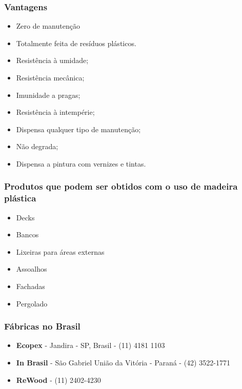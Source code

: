 \subsubsection*{\textbf{Vantagens}\cite{ReWood}}
	
	\begin{itemize}
		\item Zero de manutenção
		\item Totalmente feita de resíduos plásticos.
		\item Resistência à umidade;
		\item Resistência mecânica;
		\item Imunidade a pragas;
		\item Resistência à intempérie;
		\item Dispensa qualquer tipo de manutenção;
		\item Não degrada;
		\item Dispensa a pintura com vernizes e tintas.
	\end{itemize}

\subsubsection*{\textbf{Produtos que podem ser obtidos com o uso de madeira plástica}\cite{ReWood}}
	
	\begin{itemize}
		\item Decks
		\item Bancos 
		\item Lixeiras para áreas externas
		\item Assoalhos
		\item Fachadas
		\item Pergolado
	\end{itemize}

\subsubsection*{\textbf{Fábricas no Brasil}}
	
	\begin{itemize}
		\item \textbf{Ecopex} - Jandira - SP, Brasil - (11) 4181 1103
		\item \textbf{In Brasil} - São Gabriel União da Vitória - Paraná - (42) 3522-1771
		\item \textbf{ReWood} - (11) 2402-4230
	\end{itemize}

